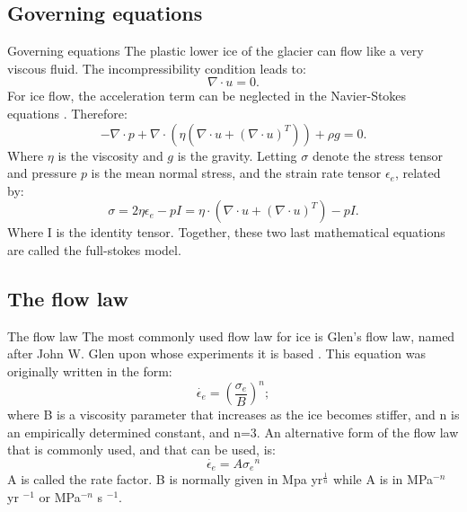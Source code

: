 \documentclass[11pt]{beamer}
\begin{document}
	\subsection{Governing equations}
		\begin{frame}{Governing equations}
		The plastic lower ice of the glacier can flow like a very viscous fluid. The incompressibility condition leads to: 
		\begin{equation}
			\nabla \cdot u=0.
		\end{equation}
		\pause For ice flow, the acceleration term can be neglected in the Navier-Stokes equations \cite[]{hutter1982mathematical}. Therefore:
		\begin{equation}
			-\nabla \cdot p+\nabla \cdot (\eta (\nabla \cdot u+(\nabla \cdot u)^T))+\rho g = 0.
		\end{equation}
		Where $\eta$ is the viscosity and $g$ is the gravity.
		\pause Letting $\sigma$ denote the stress tensor and pressure $p$ is the mean normal stress, and the strain rate tensor $\epsilon_{e}$, related by:
		\begin{equation}
			\sigma=2\eta \epsilon_{e}-pI = \eta \cdot(\nabla \cdot u+(\nabla \cdot u)^T)-pI.
		\end{equation}
		Where I is the identity tensor. Together, these two last mathematical equations are called the full-stokes model.
		
		\end{frame}
	\subsection{The flow law}
		\begin{frame}{The flow law}
			\justifying
			The most commonly used ﬂow law for ice is Glen’s ﬂow law, named after John W. Glen upon whose experiments it is based \cite{glen1958flow}. This equation was originally written in the form:
			\begin{equation}
				\dot{\epsilon_{e}}=({\frac{\sigma_{e}}{B}})^n;
			\end{equation}
			\pause where B is a viscosity parameter that increases as the ice becomes stiffer, and n is an empirically determined constant, and n=3. An alternative form of the ﬂow law that is commonly used, and that can be used, is:
			\begin{equation}
				\dot{\epsilon_{e}}=A{\sigma_{e}}^n
			\end{equation}
			\pause A is called the rate factor. B is normally given in Mpa yr$^{\frac{1}{n}}$ while A is in MPa$^{-n}$ yr $^{-1}$ or MPa$^{-n}$ s $^{-1}$.
		\end{frame}
\end{document}
